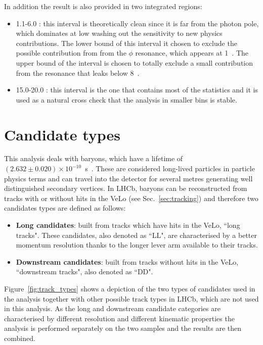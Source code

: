 In addition the result is also provided in two integrated regions:
\begin{itemize}
\item 1.1-6.0 \gevgevcccc: this interval is theoretically clean since it is far from the
photon pole, which dominates at low \qsq washing out the sensitivity to new physics contributions.
The lower bound of this interval it chosen to exclude the possible contribution from
from the $\phi$ resonance, which appears at 1~\gevgevcccc. The upper bound of the interval
is chosen to totally exclude a small contribution from the \jpsi resonance that leaks
below 8~\gevgevcccc.
\item 15.0-20.0 \gevgevcccc: this interval is the one that contains most of the
statistics and it is used as a natural cross check that the analysis in smaller bins is stable.
\end{itemize}

\section{Candidate types}

This analysis deals with \Lz baryons, which have a lifetime of \mbox{$(2.632 \pm 0.020 ) \times 10^{-10}$ s~\cite{PDG2014}}.
These are considered long-lived particles in particle physics terms and can travel into the
detector for several metres generating well distinguished secondary vertices.
In LHCb, \Lz baryons can be reconstructed from tracks with or without hits in the VeLo (see Sec.~\ref{sec:tracking}) and
therefore two candidates types are defined as follows:

\begin{itemize}
\item {\bf Long candidates}: built from tracks which have hits in the VeLo, ``long tracks".
These candidates, also denoted as ``LL", are characterised by a better momentum resolution
thanks to the longer lever arm available to their tracks.
\item {\bf Downstream candidates}: built from tracks without hits in the VeLo, 
``downstream tracks", also denoted as ``DD".
\end{itemize}

Figure~\ref{fig:track_types} shows a depiction of the two types of candidates used in the analysis
together with other possible track types in LHCb, which are not used in this analysis.
As the long and downstream candidate categories are characterised by different resolution and different
kinematic properties the analysis is performed separately on the two samples and the results are then combined.

